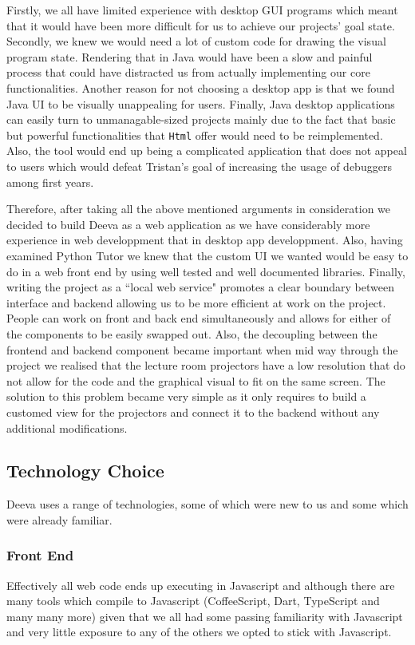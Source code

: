 \documentclass[11pt, a4paper]{article}
\begin{document}
Firstly, we all have limited experience with desktop GUI programs which meant that it would have been more difficult for us to achieve our projects' goal state.
Secondly, we knew we would need a lot of custom code for drawing the visual program state. 
Rendering that in Java would have been a slow and painful process that could have distracted us from actually implementing our core functionalities. 
Another reason for not choosing a desktop app is that we found Java UI to be visually unappealing for users.
Finally, Java desktop applications can easily turn to unmanagable-sized projects mainly due to the fact that basic but powerful functionalities that \texttt{Html} offer would need to be reimplemented. 
Also, the tool would end up being a complicated application that does not appeal to users which would defeat Tristan's goal of increasing the usage of debuggers among first years.

Therefore, after taking all the above mentioned arguments in consideration we decided to build Deeva as a web application as we have considerably more experience in web developpment that in desktop app developpment.
Also, having examined Python Tutor we knew that the custom UI we wanted would be easy to do in a web front end by using well tested and well documented libraries.
Finally, writing the project as a ``local web service" promotes a clear boundary between interface and backend allowing us to be more efficient at work on the project. 
People can work on front and back end simultaneously and allows for either of the components to be easily swapped out. 
Also, the decoupling between the frontend and backend component became important when mid way through the project we realised that the lecture room projectors have a low resolution that do not allow for the code and the graphical visual to fit on the same screen.
The solution to this problem became very simple as it only requires to build a customed view for the projectors and connect it to the backend without any additional modifications.

\subsection{Technology Choice}
Deeva uses a range of technologies, some of which were new to us and some which were already familiar.

\subsubsection{Front End}
Effectively all web code ends up executing in Javascript and although there are many tools which compile to Javascript (CoffeeScript, Dart, TypeScript and many many more) given that we all had some passing familiarity with Javascript and very little exposure to any of the others we opted to stick with Javascript.
\end{document}
